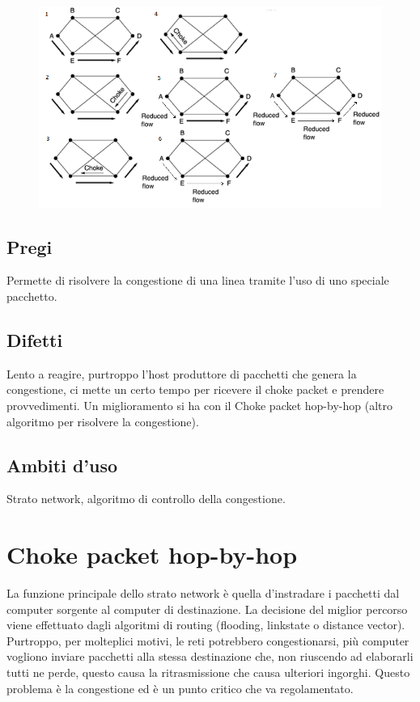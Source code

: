\begin{figure}[H]
\centering
\includegraphics[scale=0.6]{res/img/35_ChokePacket.png}
\end{figure}
\subsection{Pregi}
Permette di risolvere la congestione di una linea tramite l'uso di uno speciale pacchetto.

\subsection{Difetti}
Lento a reagire, purtroppo l'host produttore di pacchetti che genera la congestione, ci mette un certo tempo per ricevere il choke packet e prendere provvedimenti. Un miglioramento si ha con il Choke packet hop-by-hop (altro algoritmo per risolvere la congestione).

\subsection{Ambiti d'uso}
Strato network, algoritmo di controllo della congestione.

\section{Choke packet hop-by-hop}

La funzione principale dello strato network è quella d’instradare i pacchetti dal computer sorgente al computer di destinazione. La decisione del miglior percorso viene effettuato dagli algoritmi di routing (flooding, linkstate o distance vector). Purtroppo, per molteplici motivi, le reti potrebbero congestionarsi, più computer vogliono inviare pacchetti alla stessa destinazione che, non riuscendo ad elaborarli tutti ne perde, questo causa la ritrasmissione che causa ulteriori ingorghi. Questo problema è la congestione ed è un punto critico che va regolamentato.
